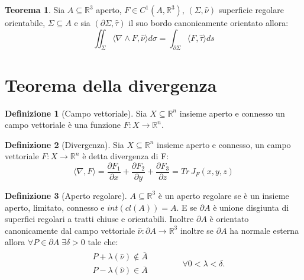 \documentclass[leqno]{article}
\theoremstyle{definition}
\newtheorem{definition}{Definizione}[section]
\numberwithin{equation}{section}
\newtheorem{theorem}{Teorema}[section]
\theoremstyle{remark}
\begin{document}
		\begin{theorem}
			Sia $A\subseteq \mathbb{R}^3$ aperto, $F\in C^1 (A,\mathbb{R}^3)$, $(\Sigma, \hat{\nu})$ superficie regolare orientabile, $\Sigma\subseteq A$ e sia $(\partial \Sigma,\hat{\tau})$ il suo bordo canonicamente orientato allora:
			\begin{equation}
				\iint_{\Sigma}\langle \nabla \wedge F, \hat{\nu}\rangle d \sigma = \int_{\partial \Sigma}\langle F, \hat{\tau}\rangle ds
			\end{equation}
		\end{theorem}
		
		\section{Teorema della divergenza}
		
		
		\begin{definition}[Campo vettoriale]
			Sia $X \subseteq \mathbb{R}^n$ insieme aperto e connesso un campo vettoriale è una funzione $F:X \to \mathbb{R}^n$.
		\end{definition}
		
		\begin{definition}[Divergenza]
			Sia $X \subseteq \mathbb{R}^n$ insieme aperto e connesso, un campo vettoriale $F:X \to \mathbb{R}^n$ è detta divergenza di F:
			\begin{equation}
				\langle \nabla , F \rangle = \frac{\partial F_1}{\partial x} +\frac{\partial F_2}{\partial y} +\frac{\partial F_3}{\partial z} = Tr \, J_F(x,y,z)
			\end{equation}
		\end{definition}
		
		\begin{definition}[Aperto regolare]
			$A\subseteq \mathbb{R}^3$ è un aperto regolare se è un insieme aperto, limitato, connesso e $int(cl(A))=A$. E se $\partial A$ è unione disgiunta di superfici regolari a tratti chiuse e orientabili. Inoltre $\partial A$ è orientato canonicamente dal campo vettoriale $\hat{\nu}: \partial A \to \mathbb{R}^3$ inoltre se $\partial A$ ha normale esterna allora $\forall P \in \partial A \; \exists \delta > 0$  tale che:
			\begin{equation}
				\begin{split}
					\begin{aligned}
						& P + \lambda (\hat{\nu})\not\in \overline{A} \\
						& P - \lambda (\hat{\nu}) \in \overline{A} 
					\end{aligned}
				\end{split} \quad \quad \quad 
				\begin{split}
					\forall 0<\lambda <\delta.
				\end{split}
			\end{equation}
		\end{definition}
		
\end{document}
